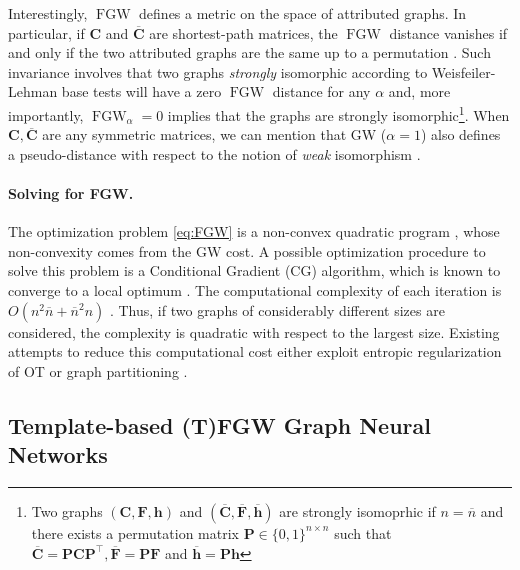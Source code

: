\documentclass{article}
\def\vh{{\bm{h}}}
\def\mC{{\bm{C}}}
\def\mF{{\bm{F}}}
\newcommand{\FGW}{\operatorname{FGW}}
\begin{document}
Interestingly,  $\FGW$ defines a metric on the space of attributed graphs. In particular, if $\mC$
and $\overline{\mC}$ are shortest-path matrices, the $\FGW$ distance vanishes if and only if the two attributed graphs are the same up to a permutation \cite[Theorem 3.2]{titouan2019optimal}. 
Such invariance involves that two graphs \emph{strongly} isomorphic according to
Weisfeiler-Lehman base tests \cite{Leman2018THERO, Togninalli19} will have a zero $\FGW$ distance for any $\alpha$ and, more importantly, $\FGW_{\alpha} = 0$ implies that the graphs are strongly isomorphic\footnote{{Two graphs $(\mC, \mF, \vh)$ and $(\overline{\mC}, \overline{\mF}, \overline{\vh})$ are strongly isomoprhic if $n = \overline{n}$ and there exists a permutation matrix $\mathbf{P} \in \{0,1\}^{n \times n}$ such that $\overline{\mC} = \mathbf{P} \mC \mathbf{P}^{\top}, \overline{\mF} = \mathbf{P} \mF$ and $\overline{\vh} = \mathbf{P} \vh$}}.
When $\mC, \overline{\mC}$ are any symmetric matrices, we can mention
that GW ($\alpha = 1$) also defines a pseudo-distance \cite[Theorem
5.8]{sturm2012space} with respect to the notion of \emph{weak} isomorphism \cite{sturm2012space, chowdhury2021generalized}. 



\paragraph{Solving for FGW.}
The optimization problem \ref{eq:FGW} is a
non-convex quadratic program \cite[equation 6]{titouan2019optimal}, whose
non-convexity comes from the GW cost. A possible optimization procedure to solve this
problem is a Conditional Gradient (CG) algorithm, which is known to converge to a
local optimum \cite{lacoste-julien-convergence-2016}. The computational complexity of each iteration is $O(n^2 \overline{n} + \overline{n}^2n)$ \cite{peyre2016gromov}. Thus, if two graphs of considerably different sizes are considered, the complexity is quadratic  with respect to the largest size. Existing attempts to reduce
this computational cost either exploit entropic regularization of OT
\cite{peyre2016gromov,scetbon2021lineartime} or graph partitioning \cite{xu2019scalable,chowdhury2021quantized}. 


\subsection{Template-based (T)FGW Graph Neural Networks \label{subsec:TFGW}} 
\end{document}
